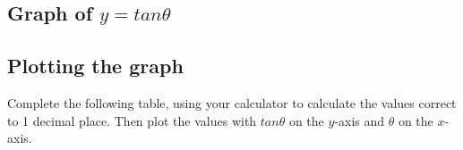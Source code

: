 \subsection{Graph of $y=tan\theta $ }
\subsection*{Plotting the graph}
\nopagebreak
Complete the following table, using your calculator to calculate the values correct to 1 decimal place. Then plot the values with $tan\theta $ on the $y$-axis and $\theta $ on the $x$-axis.\par 
\setlength\mytablespace{16\tabcolsep}
\addtolength\mytablespace{9\arrayrulewidth}
\setlength\mytablewidth{\linewidth}
\setlength\mytableroom{\mytablewidth}
\addtolength\mytableroom{-\mytablespace}
\setlength\myfixedwidth{0pt}
\setlength\mystarwidth{\mytableroom}
\addtolength\mystarwidth{-\myfixedwidth}
\divide{}
